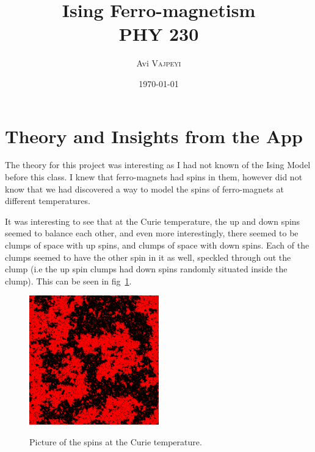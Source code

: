 \documentclass{article}
\title{Ising Ferro-magnetism\\ PHY 230} %
\author{Avi \textsc{Vajpeyi}} %
\date{\today} %
\begin{document}
\maketitle %





\section{Theory and Insights from the App }

The theory for this project was interesting as I had not known of the Ising Model before this class. I knew that ferro-magnets had spins in them, however did not know that we had discovered a way to model the spins of ferro-magnets at different temperatures.

It was interesting to see that at the Curie temperature, the up and down spins seemed to balance each other, and even more interestingly, there seemed to be clumps of space with up spins, and clumps of space with down spins. Each of the clumps seemed to have the other spin in it as well, speckled through out the clump (i.e the up spin clumps had down spins randomly situated inside the clump). This can be seen in fig~\ref{CurieTemp}.






\begin{figure}[h]
	\caption{Picture of the spins at the Curie temperature. }
	\centering
	\includegraphics[width=0.5\textwidth]{CurieTemp} \label{CurieTemp}
\end{figure}
\end{document}
